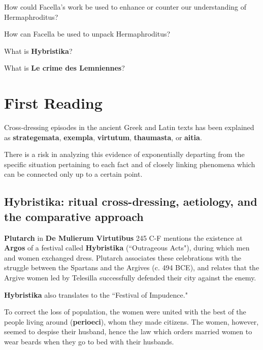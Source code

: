 \begin{qst}
    How could Facella's work be used to enhance or counter our understanding of Hermaphroditus?
\end{qst}


\begin{qst}
    How can Facella be used to unpack Hermaphroditus?
\end{qst}


\begin{qst}
    What is \textbf{Hybristika}?
\end{qst}


\begin{qst}
    What is \textbf{Le crime des Lemniennes}?
\end{qst}


\section{First Reading}
\label{sec:FirRead11}


Cross-dressing episodes in the ancient Greek and Latin texts has been explained as \textbf{strategemata}, \textbf{exempla}, \textbf{virtutum}, \textbf{thaumasta}, or \textbf{aitia}.

\begin{rmk}
    There is a risk in analyzing this evidence of exponentially departing from the specific situation pertaining to each fact and of closely linking phenomena which can be connected only up to a certain point.
\end{rmk}


\subsection{Hybristika: ritual cross-dressing, aetiology, and the comparative approach}

\textbf{Plutarch} in \textbf{De Mulierum Virtutibus} 245 C-F mentions the existence at \textbf{Argos} of a festival called \textbf{Hybristika} (``Outrageous Acts"), during which men and women exchanged dress. Plutarch associates these celebrations with the struggle between the Spartans and the Argives (c. 494 BCE), and relates that the Argive women led by Telesilla successfully defended their city against the enemy. 

\begin{nte}
    \textbf{Hybristika} also translates to the ``Festival of Impudence."
\end{nte}

\begin{rmk}
    To correct the loss of population, the women were united with the best of the people living around (\textbf{perioeci}), whom they made citizens. The women, however, seemed to despise their husband, hence the law which orders married women to wear beards when they go to bed with their husbands.
\end{rmk}

